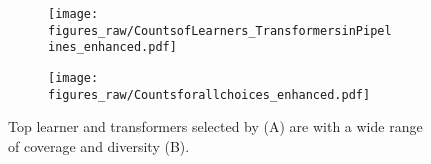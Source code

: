 \begin{figure*}[t]
 \centering
 \ncp\ncp\ncp
 \begin{subfigure}{0.42\textwidth}
    \centering
    \texttt{[image: figures\_raw/CountsofLearners\_TransformersinPipelines\_enhanced.pdf]}
    \ncp\ncp
    \caption{}
    \label{fig:diversity}
  \end{subfigure}%
  \ncp\ncp\ncp
 \begin{subfigure}{0.42\textwidth}
 \centering
    \texttt{[image: figures\_raw/Countsforallchoices\_enhanced.pdf]}
    \ncp\ncp
    \caption{}
    \label{fig:coverage}
  \end{subfigure}%
  \ncp\ncp\ncp
    \caption{Top learner and transformers selected by {\sysname} (A) are with a wide range of coverage and diversity (B).}
  \label{varying operators chosen}
\end{figure*}
